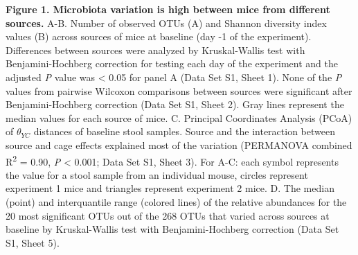 \documentclass[
  11pt,
]{article}
\begin{document}
\textbf{Figure 1. Microbiota variation is high between mice from
different sources.} A-B. Number of observed OTUs (A) and Shannon
diversity index values (B) across sources of mice at baseline (day -1 of
the experiment). Differences between sources were analyzed by
Kruskal-Wallis test with Benjamini-Hochberg correction for testing each
day of the experiment and the adjusted \emph{P} value was \textless{}
0.05 for panel A (Data Set S1, Sheet 1). None of the \emph{P} values
from pairwise Wilcoxon comparisons between sources were significant
after Benjamini-Hochberg correction (Data Set S1, Sheet 2). Gray lines
represent the median values for each source of mice. C. Principal
Coordinates Analysis (PCoA) of \(\theta_{YC}\) distances of baseline
stool samples. Source and the interaction between source and cage
effects explained most of the variation (PERMANOVA combined
R\textsuperscript{2} = 0.90, \emph{P} \textless{} 0.001; Data Set S1,
Sheet 3). For A-C: each symbol represents the value for a stool sample
from an individual mouse, circles represent experiment 1 mice and
triangles represent experiment 2 mice. D. The median (point) and
interquantile range (colored lines) of the relative abundances for the
20 most significant OTUs out of the 268 OTUs that varied across sources
at baseline by Kruskal-Wallis test with Benjamini-Hochberg correction
(Data Set S1, Sheet 5).

\newpage
\end{document}
